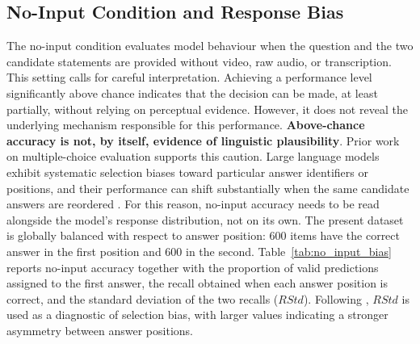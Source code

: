 \subsection*{No-Input Condition and Response Bias}
\label{subsec:no_input}
The no-input condition evaluates model behaviour when the question and the two
candidate statements are provided without video, raw audio, or transcription.
This setting calls for careful interpretation. Achieving a performance level significantly above chance indicates that the decision can be made, at least partially, without relying on perceptual evidence. However, it does not reveal the underlying mechanism responsible for this performance. \textbf{Above-chance
accuracy is not, by itself, evidence of linguistic plausibility}.
Prior work on multiple-choice evaluation supports this caution. Large
language models exhibit systematic selection biases toward particular answer
identifiers or positions, and their performance can shift substantially when
the same candidate answers are reordered
\cite{zheng2024largelanguagemodelsrobust,
pezeshkpour-hruschka-2024-large}.
For this reason, no-input accuracy needs to be read alongside the model's
response distribution, not on its own.
The present dataset is globally balanced with respect to answer position:
600 items have the correct answer in the first position and 600 in the second. Table~\ref{tab:no_input_bias} reports no-input accuracy
together with the proportion of valid predictions assigned to the first
answer, the recall obtained when each answer position is correct, and the
standard deviation of the two recalls ($RStd$). Following
\cite{zheng2024largelanguagemodelsrobust}, $RStd$ is used as a diagnostic of
selection bias, with larger values indicating a stronger asymmetry between
answer positions.
